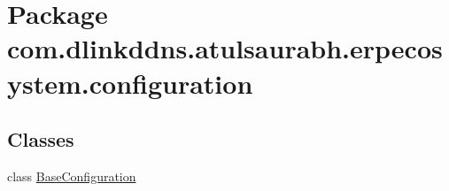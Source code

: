 \hypertarget{namespacecom_1_1dlinkddns_1_1atulsaurabh_1_1erpecosystem_1_1configuration}{}\section{Package com.\+dlinkddns.\+atulsaurabh.\+erpecosystem.\+configuration}
\label{namespacecom_1_1dlinkddns_1_1atulsaurabh_1_1erpecosystem_1_1configuration}
\subsection*{Classes}
\begin{DoxyCompactItemize}
\item 
class \mbox{\hyperlink{classcom_1_1dlinkddns_1_1atulsaurabh_1_1erpecosystem_1_1configuration_1_1_base_configuration}{Base\+Configuration}}
\end{DoxyCompactItemize}
